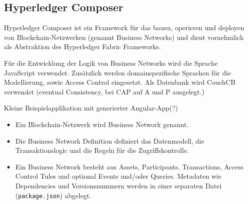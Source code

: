 \subsection{Hyperledger Composer}
        Hyperledger Composer ist ein Framework für das bauen, operieren und deployen von Blockchain-Netzwerken (genannt Business Networks) und dient vornehmlich als Abstraktion des Hyperledger Fabric Frameworks. 
        
        Für die Entwicklung der Logik von Business Networks wird die Sprache JavaScript verwendet. 
        Zusätzlich werden domainspezifische Sprachen für die Modellierung, sowie Access Control eingesetzt.
        Als Datenbank wird CouchCB verwendet (eventual Consistency, bei CAP auf A und P ausgelegt.)
        
        Kleine Beispielapplikation mit generierter Angular-App(?)
        
        \begin{itemize}[noitemsep]
            \item Ein Blockchain-Netzwerk wird Business Network genannt. 
            \item Die Business Network Definition definiert das Datenmodell, die Transaktionslogic und die Regeln für die Zugriffskontrolle.
            \item Ein Business Network besteht aus Assets, Participants, Transactions, Access Control Tules und optional Events und/\-oder Queries.
                Metadaten wie Dependencies und Versionsnummern werden in einer separaten Datei (\colorbox{light-gray}{\lstinline|package.json|}) abgelegt.
        \end{itemize}
        
